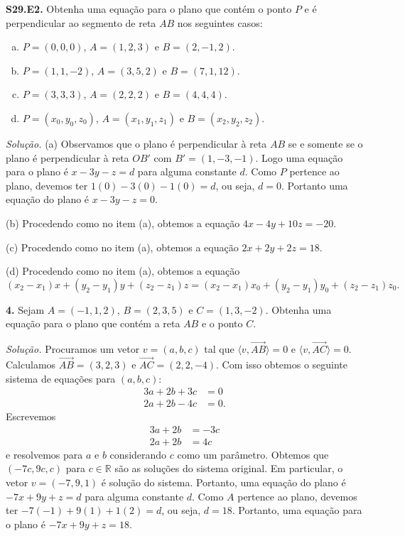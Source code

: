 \documentclass[a4paper,11pt]{article}
\newcommand{\R}{\mathbb{R}}
\begin{document}
\textbf{S29.E2.}
Obtenha uma equação para o plano que contém o ponto $P$ e é perpendicular ao segmento de reta $AB$ nos seguintes casos:
\begin{enumerate}[(a)]
  \item
    $P = (0,0,0)$, $A = (1,2,3)$ e $B = (2,-1,2)$.
  \item
    $P = (1,1,-2)$, $A = (3,5,2)$ e $B = (7,1,12)$.
  \item
    $P = (3,3,3)$, $A = (2,2,2)$ e $B = (4,4,4)$.
  \item
    $P = (x_0, y_0, z_0)$, $A = (x_1,y_1,z_1)$ e $B = (x_2,y_2,z_2)$.
\end{enumerate}

\vspace{\baselineskip}

\emph{Solução.}
(a)
Observamos que o plano é perpendicular à reta $AB$ se e somente se o plano é perpendicular à reta $OB'$ com $B' = (1,-3,-1)$.
Logo uma equação para o plano é $x - 3y - z = d$ para alguma constante $d$.
Como $P$ pertence ao plano, devemos ter $1(0) - 3(0) -1(0) = d$, ou seja, $d=0$.
Portanto uma equação do plano é $x - 3y - z = 0$.

(b)
Procedendo como no item (a), obtemos a equação $4x - 4y + 10z = -20$.

(c)
Procedendo como no item (a), obtemos a equação $2x + 2y + 2z = 18$.

(d)
Procedendo como no item (a), obtemos a equação
\[
  (x_2 - x_1)x + (y_2 - y_1)y + (z_2 - z_1)z = (x_2 - x_1)x_0 + (y_2 - y_1)y_0 + (z_2 - z_1)z_0.
\]

\vspace{\baselineskip}

\textbf{4.}
Sejam $A = (-1,1,2)$, $B = (2,3,5)$ e $C = (1,3,-2)$.
Obtenha uma equação para o plano que contém a reta $AB$ e o ponto $C$.

\vspace{\baselineskip}

\emph{Solução.}
Procuramos um vetor $v = (a,b,c)$ tal que $\langle v, \overrightarrow{AB} \rangle = 0$ e $\langle v, \overrightarrow{AC} \rangle = 0$.
Calculamos $\overrightarrow{AB} = (3,2,3)$ e $\overrightarrow{AC} = (2,2,-4)$.
Com isso obtemos o seguinte sistema de equações para $(a,b,c)$:
\begin{align*}
  3a + 2b + 3c & = 0 \\
  2a + 2b - 4c & = 0.
\end{align*}
Escrevemos
\begin{align*}
  3a + 2b & = -3c \\
  2a + 2b & = 4c
\end{align*}
e resolvemos para $a$ e $b$ considerando $c$ como um parâmetro.
Obtemos que $(-7c, 9c, c)$ para $c \in \R$ são as soluções do sistema original.
Em particular, o vetor $v = (-7, 9, 1)$ é solução do sistema.
Portanto, uma equação do plano é $-7x + 9y + z = d$ para alguma constante $d$.
Como $A$ pertence ao plano, devemos ter $-7(-1) + 9(1) + 1(2) = d$, ou seja, $d = 18$.
Portanto, uma equação para o plano é $-7x + 9y + z = 18$.
\end{document}

